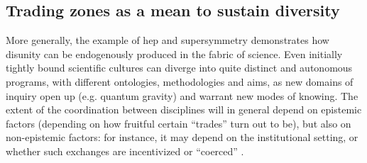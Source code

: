 \documentclass[smallextended]{svjour3}
\begin{document}
\subsection{Trading zones as a mean to sustain diversity}

More generally, the example of \gls{hep} and supersymmetry demonstrates how disunity can be endogenously produced in the fabric of science. Even initially tightly bound scientific cultures can diverge into quite distinct and autonomous programs, with different ontologies, methodologies and aims, as new domains of inquiry open up (e.g. quantum gravity) and warrant new modes of knowing. The extent of the coordination between disciplines will in general depend on epistemic factors (depending on how fruitful certain ``trades'' turn out to be), but also on non-epistemic factors: for instance, it may depend on the institutional setting, or whether such exchanges are incentivized or ``coerced'' \citep{Collins2010}.
\end{document}

